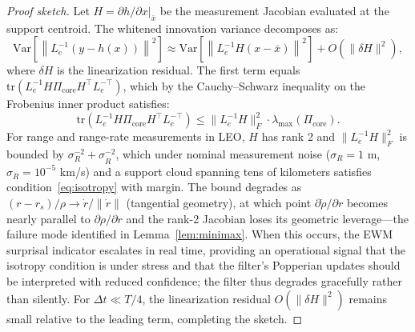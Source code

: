 \documentclass[10pt,a4paper]{amsart}
\begin{document}
\begin{proof}[Proof sketch]
Let $H = \partial h/\partial x|_{\bar{x}}$ be the measurement Jacobian evaluated at the support centroid. The whitened innovation variance decomposes as:
\[
\mathrm{Var}\!\left[\left\|L_e^{-1}(y - h(x))\right\|^2\right] \approx \mathrm{Var}\!\left[\left\|L_e^{-1}H(x - \bar{x})\right\|^2\right] + O(\|\delta H\|^2),
\]
where $\delta H$ is the linearization residual. The first term equals $\mathrm{tr}(L_e^{-1}H\Pi_{\mathrm{core}}H^\top L_e^{-\top})$, which by the Cauchy--Schwarz inequality on the Frobenius inner product satisfies:
\[
\mathrm{tr}(L_e^{-1}H\Pi_{\mathrm{core}}H^\top L_e^{-\top}) \leq \|L_e^{-1}H\|_F^2 \cdot \lambda_{\max}(\Pi_{\mathrm{core}}).
\]
For range and range-rate measurements in LEO, $H$ has rank 2 and $\|L_e^{-1}H\|_F^2$ is bounded by $\sigma_R^{-2} + \sigma_{\dot{R}}^{-2}$, which under nominal measurement noise ($\sigma_R = 1$ m, $\sigma_{\dot{R}} = 10^{-5}$ km/s) and a support cloud spanning tens of kilometers satisfies condition~\eqref{eq:isotropy} with margin. The bound degrades as $(r - r_s)/\rho \to \dot{r}/\|\dot{r}\|$ (tangential geometry), at which point $\partial\dot{\rho}/\partial r$ becomes nearly parallel to $\partial\rho/\partial r$ and the rank-2 Jacobian loses its geometric leverage---the failure mode identified in Lemma~\ref{lem:minimax}. When this occurs, the EWM surprisal indicator escalates in real time, providing an operational signal that the isotropy condition is under stress and that the filter's Popperian updates should be interpreted with reduced confidence; the filter thus degrades gracefully rather than silently. For $\Delta t \ll T/4$, the linearization residual $O(\|\delta H\|^2)$ remains small relative to the leading term, completing the sketch.
\end{proof}
\end{document}
